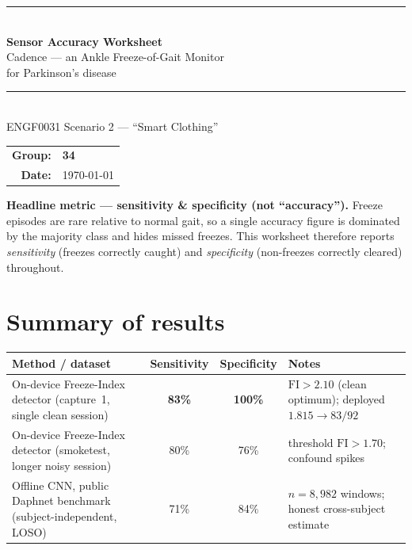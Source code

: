 \documentclass[11pt,a4paper]{article}
\renewcommand{\arraystretch}{1.25}
\begin{document}
\begin{titlepage}
\centering
\vspace*{1.5cm}
{\color{navy}\rule{\linewidth}{1.5pt}}\\[0.5cm]
{\Huge\bfseries\color{navy} Sensor Accuracy Worksheet}\\[0.35cm]
{\LARGE Cadence --- an Ankle Freeze-of-Gait Monitor}\\[0.25cm]
{\large for Parkinson's disease}\\[0.5cm]
{\color{navy}\rule{\linewidth}{1.5pt}}\\[1.2cm]

{\large ENGF0031 \quad Scenario 2 --- ``Smart Clothing''}\\[2.0cm]

\begin{tabular}{@{}r l@{}}
\textbf{Group:} & \textbf{34}\\[0.5cm]
\textbf{Date:} & \today\\
\end{tabular}

\vfill
\begin{keybox}
\small\textbf{Headline metric --- sensitivity \& specificity (not ``accuracy'').}
Freeze episodes are rare relative to normal gait, so a single accuracy figure is
dominated by the majority class and hides missed freezes. This worksheet therefore
reports \emph{sensitivity} (freezes correctly caught) and \emph{specificity}
(non-freezes correctly cleared) throughout.
\end{keybox}
\vspace*{1cm}
\end{titlepage}

\tableofcontents
\thispagestyle{fancy}
\newpage

\section*{Summary of results}

\begin{keybox}
\renewcommand{\arraystretch}{1.35}
\begin{tabular}{@{}p{6.4cm} c c p{4.0cm}@{}}
\textbf{Method / dataset} & \textbf{Sensitivity} & \textbf{Specificity} & \textbf{Notes}\\
\midrule
On-device Freeze-Index detector \newline (capture~1, single clean session)
  & \textbf{83\%} & \textbf{100\%} & $\mathrm{FI}>2.10$ (clean optimum); deployed $1.815\to83/92$\\
On-device Freeze-Index detector \newline (smoketest, longer noisy session)
  & 80\% & 76\% & threshold $\mathrm{FI}>1.70$; confound spikes\\
Offline CNN, public Daphnet benchmark \newline (subject-independent, LOSO)
  & 71\% & 84\% & $n=8{,}982$ windows; honest cross-subject estimate\\
\end{tabular}
\end{keybox}
\end{document}
